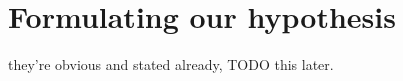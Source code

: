 


%
%
%
%

\section{Formulating our hypothesis}
they're obvious and stated already, TODO this later.

